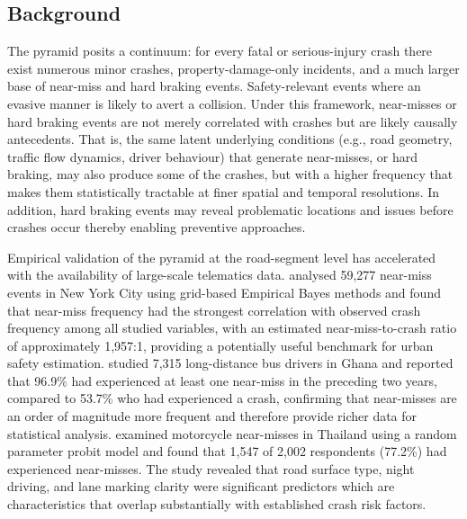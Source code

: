 \documentclass[letterpaper,8pt]{extarticle}  %
\begin{document}
\begin{doublespacing}
\begin{linenumbers}
\subsection{Background}

The pyramid posits a continuum: for every fatal or serious-injury crash there exist numerous minor
crashes, property-damage-only incidents, and a much larger base of near-miss and hard braking
events. Safety-relevant events where an evasive manner is likely to avert a
collision. Under this framework, near-misses or hard braking events are not merely correlated with
crashes but are likely causally antecedents. That is, the same latent underlying conditions (e.g., road
geometry, traffic flow dynamics, driver behaviour) that generate near-misses, or hard braking, may
also produce some of the crashes, but with a higher frequency that makes them statistically
tractable at finer spatial and temporal resolutions. In addition, hard braking events may reveal problematic locations and issues before crashes occur thereby enabling preventive approaches. 

Empirical validation of the pyramid at the road-segment level has accelerated
with the availability of large-scale telematics data. \citet{Xu2024EstimatingStudy}
analysed 59,277 near-miss events in New York City using grid-based Empirical
Bayes methods and found that near-miss frequency had the strongest correlation
with observed crash frequency among all studied variables, with an estimated
near-miss-to-crash ratio of approximately 1,957:1, providing a potentially
useful benchmark for urban safety estimation. \citet{Amoadu2024PrevalenceGhana} studied
7,315 long-distance bus drivers in Ghana and reported that 96.9\% had
experienced at least one near-miss in the preceding two years, compared to
53.7\% who had experienced a crash, confirming that near-misses are an order
of magnitude more frequent and therefore provide richer data for statistical
analysis. \citet{Jomnonkwao2023ContributingApproach} examined motorcycle near-misses in Thailand
using a random parameter probit model and found that 1,547 of 2,002
respondents (77.2\%) had experienced near-misses. The study revealed that road surface type,
night driving, and lane marking clarity were significant predictors which are characteristics
that overlap substantially with established crash risk factors.



\end{linenumbers}
\end{doublespacing}
\end{document}
